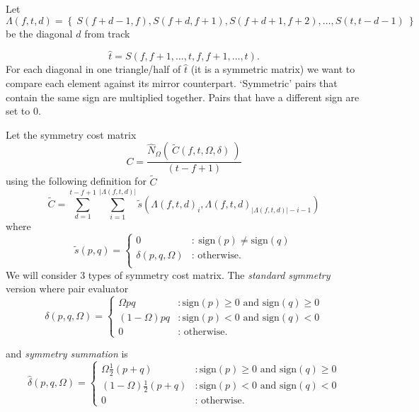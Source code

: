 \documentclass[twocolumn]{article}
\begin{document}
	Let \begin{dmath*}
		\Lambda( f,t,d ) = \left\{~ 
		S(f+d-1,f), S(f+d, f+1), S(f+d+1, f+2),\ldots, S(t, t-d-1)
		~ \right\} 
	\end{dmath*}be the diagonal $d$ from track 
	
	\[
	\hat t= S(f,f+1,\ldots,t,f,f+1,\ldots,t).
	\] For each diagonal in one triangle/half of $\hat t$ (it is a symmetric matrix) we want to compare each element against its mirror counterpart. `Symmetric' pairs that contain the same sign are multiplied together. Pairs that have a different sign are set to $0$.

	Let the symmetry cost matrix
	\begin{dmath*} C = \frac{\hat N_\Omega(~ \tilde C(f, t, \Omega, \delta)~)}{(t-f+1)}\end{dmath*} using the following definition for $\tilde C$
	\begin{dmath*}\tilde C=	\sum_{d=1}^{t-f+1} 
		\sum_{i=1}^{|\Lambda( f,t,d )|} \tilde{s}(\Lambda( f,t,d )_i,\Lambda( f,t,d )_{ |\Lambda( f,t,d )|-i-1 })
	\end{dmath*}  where
\begin{dmath*}
	\tilde{s}(p,q) = 
	\left\{
	\begin{array}{lr}
		0  & : ~\mathrm{sign}( p ) \ne \mathrm{sign}( q )   \\
		\delta( p, q, \Omega ) & : \mbox{~otherwise.}  \\
	\end{array}
	\right.
\end{dmath*}
	We will consider $3$ types of symmetry cost matrix. The \textit{standard symmetry} version where pair evaluator 
		\begin{dmath*}\delta( p,q, \Omega ) = \left\{
				\begin{array}{lr}
					\Omega  p q   & : \mathrm{sign}(p) \ge 0 \text{~and~} \mathrm{sign}(q) \ge 0   \\
					 (1-\Omega)  p q  & : \mathrm{sign}(p) < 0 \text{~and~} \mathrm{sign}(q) < 0 \\
					 0 & :  \mbox{~otherwise.}
				\end{array}
				\right.
		\end{dmath*}
		
		and \textit{symmetry summation} is
		\begin{dmath*}\hat \delta( p,q, \Omega ) = \left\{
			\begin{array}{lr}
			\Omega \frac{1}{2} ( p + q )	  & :  \mathrm{sign}(p) \ge 0 \text{~and~} \mathrm{sign}(q) \ge 0   \\
			 (1-\Omega) \frac{1}{2} ( p + q ) & : 	\mathrm{sign}(p) < 0 \text{~and~} \mathrm{sign}(q) < 0 \\
			 0 & :  \mbox{~otherwise.}
			\end{array}
			\right.
	\end{dmath*}
	
\end{document}

